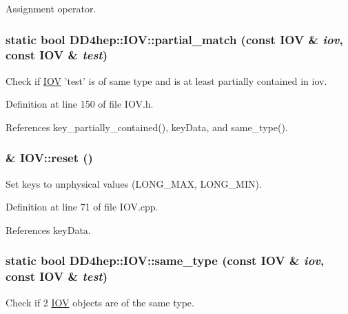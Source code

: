 Assignment operator. \hypertarget{class_d_d4hep_1_1_i_o_v_ab55de0c04c0d06c457e248b4db839b08}{
\subsubsection[{partial\_\-match}]{\setlength{\rightskip}{0pt plus 5cm}static bool DD4hep::IOV::partial\_\-match (const {\bf IOV} \& {\em iov}, \/  const {\bf IOV} \& {\em test})}}
\label{class_d_d4hep_1_1_i_o_v_ab55de0c04c0d06c457e248b4db839b08}


Check if \hyperlink{class_d_d4hep_1_1_i_o_v}{IOV} 'test' is of same type and is at least partially contained in iov. 

Definition at line 150 of file IOV.h.

References key\_\-partially\_\-contained(), keyData, and same\_\-type().\hypertarget{class_d_d4hep_1_1_i_o_v_acbc1f282468528fd38d471bf7f9d58c0}{
\subsubsection[{reset}]{ \& IOV::reset ()}}
\label{class_d_d4hep_1_1_i_o_v_acbc1f282468528fd38d471bf7f9d58c0}


Set keys to unphysical values (LONG\_\-MAX, LONG\_\-MIN). 

Definition at line 71 of file IOV.cpp.

References keyData.\hypertarget{class_d_d4hep_1_1_i_o_v_a25febeab024c770e5846197ca2a6b6fa}{
\subsubsection[{same\_\-type}]{\setlength{\rightskip}{0pt plus 5cm}static bool DD4hep::IOV::same\_\-type (const {\bf IOV} \& {\em iov}, \/  const {\bf IOV} \& {\em test})}}
\label{class_d_d4hep_1_1_i_o_v_a25febeab024c770e5846197ca2a6b6fa}


Check if 2 \hyperlink{class_d_d4hep_1_1_i_o_v}{IOV} objects are of the same type. 


